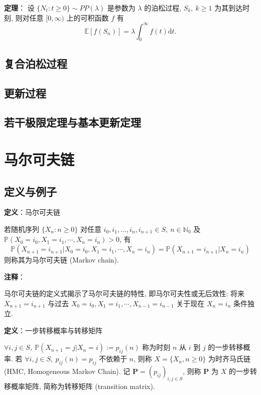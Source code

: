 \documentclass[openany]{ctexbook}
\theoremstyle{kaiti}
\theoremstyle{normal}
\begin{document}
\textbf{定理}：  
  设 $\{N_t:t\geqslant0\}\sim PP(\lambda)$ 是参数为 $\lambda$ 的泊松过程, $S_k,~k\geqslant1$ 为其到达时刻, 则对任意 $[0,\infty)$ 上的可积函数 $f$ 有
\begin{equation}
  \mathbb{E}\left[f(S_n)\right]=\lambda\int_0^\infty f(t)\mathrm{d}t.
\end{equation}
  
\section{复合泊松过程}
  
\section{更新过程}
  
\section{若干极限定理与基本更新定理}

\chapter{马尔可夫链}

\section{定义与例子}

\textbf{定义}：马尔可夫链

若随机序列 $\{X_n:n\geqslant 0\}$ 对任意 $i_0,i_1,\ldots,i_n,i_{n+1}\in S,\ n\in\mathbb{N}_0$ 及 $\mathbb{P}(X_0=i_0,X_1=i_1,\cdots,X_n=i_n)>0$, 有
\begin{equation}
  \mathbb{P}(X_{n+1}=i_{n+1}|X_0=i_0,X_1=i_1,\cdots,X_n=i_n)=\mathbb{P}(X_{n+1}=i_{n+1}|X_n=i_n)
\end{equation}
则称其为马尔可夫链 (Markov chain).

\textbf{注释}：

马尔可夫链的定义式揭示了马尔可夫链的特性, 即马尔可夫性或无后效性: 将来 $X_{n+1}=i_{n+1}$ 与过去 $X_0=i_0,X_1=i_1,\cdots,X_{n-1}=i_{n-1}$ 关于现在 $X_n=i_n$ 条件独立.

\textbf{定义}：一步转移概率与转移矩阵

$\forall i,j\in S,\ \mathbb{P}(X_{n+1}=j|X_n=i):=p_{ij}(n)$ 称为时刻 $n$ 从 $i$ 到 $j$ 的一步转移概率. 若 $\forall i,j\in S,\ p_{ij}(n)=p_{ij}$ 不依赖于 $n$, 则称 $X=\{X_n,n\geqslant 0\}$ 为时齐马氏链 (HMC, Homogeneous Markov Chain). 记 $\bm{P}=(p_{ij})_{i,j\in S}$, 则称 $\bm{P}$ 为 $X$ 的一步转移概率矩阵, 简称为转移矩阵 (transition matrix).
\end{document}
